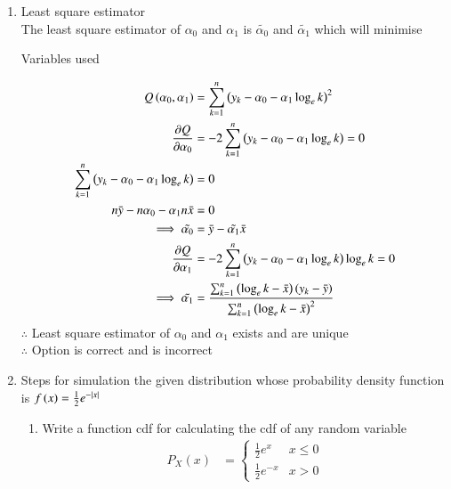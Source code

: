 \documentclass[journal,12pt,onecolumn]{IEEEtran}
\theoremstyle{remark}
\begin{document}
\begin{enumerate}
\begin{enumerate}
\item Least square estimator\\
The least square estimator of $\alpha_{0}$ and $\alpha_{1}$ is $\tilde{\alpha_{0}}$ and $\tilde{\alpha_{1}}$ which will minimise
\begin{table}[!htb]
	
	\caption{Variables used}
	\label{table_gate23_st_26}
\end{table}
\begin{align}
	Q\brak{\alpha_{0},\alpha_{1}} &=  \sum_{k = 1}^{n} \brak{y_{k}-\alpha_{0}-\alpha_{1} \log_{e}k}^2\\
\frac{\partial Q}{\partial \alpha_{0}} &= -2 \sum_{k = 1}^{n} \brak{y_{k}-\alpha_{0}-\alpha_{1} \log_{e}k} = 0\\
	\sum_{k = 1}^{n} \brak{y_{k}-\alpha_{0}-\alpha_{1} \log_{e}k} &= 0\\
	n\bar{y} - n\alpha_{0} - \alpha_{1}n\bar{x} &= 0 \\%
	\implies \tilde{\alpha_{0}} &= \bar{y} - \tilde{\alpha_{1}}\bar{x}\\
	\frac{\partial Q}{\partial \alpha_{1}} &= -2 \sum_{k = 1}^{n} \brak{y_{k}-\alpha_{0}-\alpha_{1} \log_{e}k}\log_{e}k = 0\\
	\implies \tilde{\alpha_{1}} &= \frac{\sum_{k = 1}^{n}\brak{\log_{e}k-\bar{x}}\brak{y_{k}-\bar{y}}}{\sum_{k = 1}^{n}\brak{\log_{e}k-\bar{x}}^2}
\end{align}
$\therefore$ Least square estimator of $\alpha_{0}$ and $\alpha_{1}$ exists and are unique\\
$\therefore$ Option  is correct and  is incorrect\\
\item Steps for simulation the given distribution whose 
	probability density function is $ f\left(x\right) = \frac{1}{2} e^{-|x|}$
\begin{enumerate}
\item Write a function cdf for calculating the cdf of any random variable\\
	 \begin{align}
  P_X(x) &= 
  \begin{cases}
          \frac{1}{2} e^{x} & x \le 0
  \\
          \frac{1}{2} e^{-x} &  x > 0
  \end{cases}
  \end{align}


\end{enumerate}
\end{enumerate}
\end{enumerate}
\end{document}
